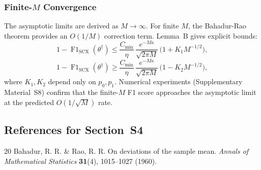 \subsubsection{Finite-$M$ Convergence}

The asymptotic limits are derived as $M\to\infty$.  For finite $M$, the
Bahadur-Rao theorem provides an $O(1/M)$ correction term.  Lemma~B gives
explicit bounds:
\[
1-\operatorname{F1}_{\text{SCX}}(\theta^\dagger)
\le \frac{C_{\min}}{\eta}\,
    \frac{e^{-M\kappa}}{\sqrt{2\pi M}}\,
    \bigl(1 + K_1 M^{-1/2}\bigr),
\]
\[
1-\operatorname{F1}_{\text{SCX}}(\theta^\dagger)
\ge \frac{C_{\min}}{\eta}\,
    \frac{e^{-M\kappa}}{\sqrt{2\pi M}}\,
    \bigl(1 - K_2 M^{-1/2}\bigr),
\]
where $K_1,K_2$ depend only on $p_0,p_1$.  Numerical experiments
(Supplementary Material~S8) confirm that the finite-$M$ F1 score approaches
the asymptotic limit at the predicted $O(1/\sqrt{M})$ rate.

\subsection*{References for Section~S4}

\begingroup
\small
\begin{thebibliography}{20}
 Bahadur, R. R. \& Rao, R. R. On deviations of the sample mean. \textit{Annals of Mathematical Statistics} \textbf{31}(4), 1015--1027 (1960).
\end{thebibliography}
\endgroup

\endinput
